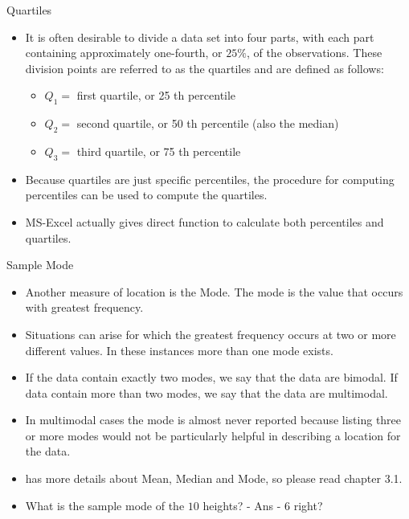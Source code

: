\documentclass[8pt, usepdftitle=false]{beamer}
\begin{document}
\begin{frame}{Quartiles}

\begin{itemize}
  

  \item It is often desirable to divide a data set into four parts, with each part containing approximately one-fourth, or $25 \%$, of the observations. These division points are referred to as the \alert{quartiles} and are defined as follows:

  \begin{itemize}
    \item $Q_1=$ first quartile, or 25 th percentile
    \item $Q_2=$ second quartile, or 50 th percentile (also the median)
    \item $Q_3=$ third quartile, or 75 th percentile
  \end{itemize}

\item Because \alert{quartiles} are just specific percentiles, the procedure for computing percentiles can be used to compute the quartiles.

\item MS-Excel actually gives direct function to calculate both percentiles and quartiles.


\end{itemize}


\end{frame}




\begin{frame}{Sample Mode}


\begin{itemize}


\item Another measure of location is the Mode. The mode is the value that occurs with greatest frequency.


\item Situations can arise for which the greatest frequency occurs at two or more different values. In these instances more than one mode exists. 


\item If the data contain exactly two modes, we say that the data are bimodal. If data contain more than two modes, we say that the data are multimodal. 


\item In multimodal cases the mode is almost never reported because listing three or more modes would not be particularly helpful in describing a location for the data.

\item \citet*{anderson_statistics_2020} has more details about Mean, Median and Mode, so please read chapter 3.1.

\item What is the sample mode of the $10$ heights? - Ans - $6$ right?

\end{itemize}





\end{frame}
\end{document}
